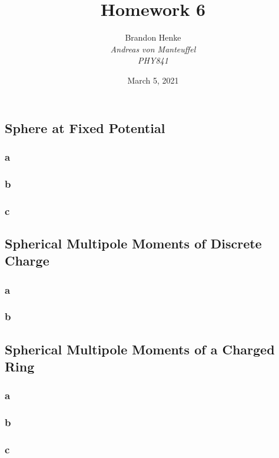 \documentclass{article}
\title{Homework 6}
\author{Brandon Henke\\\textit{Andreas von Manteuffel}\\\textit{PHY841}}
\date{March 5, 2021}
\begin{document}
\maketitle
\begin{multicols*}{2}

	\subsection{Sphere at Fixed Potential}
	\subsubsection*{a}
	\subsubsection*{b}
	\subsubsection*{c}
	\subsection{Spherical Multipole Moments of Discrete Charge}
	\subsubsection*{a}
	\subsubsection*{b}
	\subsection{Spherical Multipole Moments of a Charged Ring}
	\subsubsection*{a}
	\subsubsection*{b}
	\subsubsection*{c}

\end{multicols*}
\end{document}
